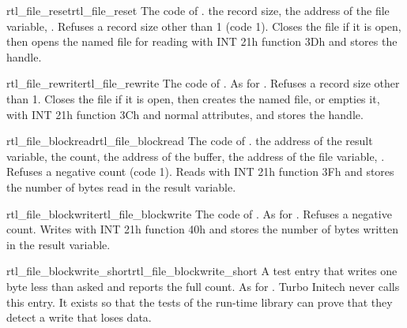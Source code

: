 \begin{RtlEntry}{rtl_file_reset}{rtl\_file\_reset}
\LFunction The code of .
\LCalling {} the record size,  the address of the file
variable, .
\LRemarks Refuses a record size other than 1 (code 1).  Closes the file if
it is open, then opens the named file for reading with INT 21h function
3Dh and stores the handle.
\LSeeAlso {}
\end{RtlEntry}

\begin{RtlEntry}{rtl_file_rewrite}{rtl\_file\_rewrite}
\LFunction The code of .
\LCalling As for .
\LRemarks Refuses a record size other than 1.  Closes the file if it is
open, then creates the named file, or empties it, with INT 21h function
3Ch and normal attributes, and stores the handle.
\LSeeAlso {}
\end{RtlEntry}

\begin{RtlEntry}{rtl_file_blockread}{rtl\_file\_blockread}
\LFunction The code of .
\LCalling {} the address of the result variable,  the
count,  the address of the buffer,  the address of
the file variable, .
\LRemarks Refuses a negative count (code 1).  Reads with INT 21h function
3Fh and stores the number of bytes read in the result variable.
\LSeeAlso {}
\end{RtlEntry}

\begin{RtlEntry}{rtl_file_blockwrite}{rtl\_file\_blockwrite}
\LFunction The code of .
\LCalling As for .
\LRemarks Refuses a negative count.  Writes with INT 21h function 40h and
stores the number of bytes written in the result variable.
\LSeeAlso {}
\end{RtlEntry}

\begin{RtlEntry}{rtl_file_blockwrite_short}{rtl\_file\_blockwrite\_short}
\LFunction A test entry that writes one byte less than asked and reports
the full count.
\LCalling As for .
\LRemarks Turbo Initech never calls this entry.  It exists so that the
tests of the run-time library can prove that they detect a write that
loses data.
\LSeeAlso {}
\end{RtlEntry}

